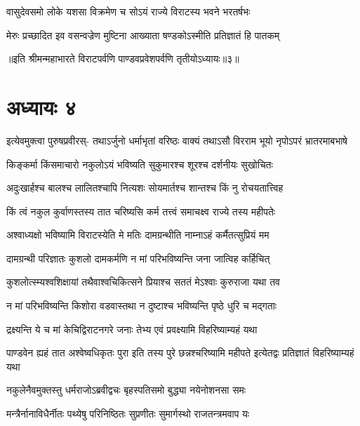 


\twolineshloka
{वासुदेवसमो लोके यशसा विक्रमेण च}
{सोऽयं राज्ये विराटस्य भवने भरतर्षभः}


\twolineshloka
{मेरुः प्रच्छादित इव वसन्वज्रेण मुष्टिना}
{आख्याता षण्डकोऽस्मीति प्रतिज्ञातं हि पातकम्}

॥इति श्रीमन्महाभारते विराटपर्वणि पाण्डवप्रवेशपर्वणि तृतीयोऽध्यायः॥३॥

\chapter{अध्यायः ४}

\fourlineindentedshloka
{इत्येवमुक्त्वा पुरुषप्रवीरस्-}
{तथाऽर्जुनो धर्माभृतां वरिष्ठः}
{वाक्यं तथाऽसौ विरराम भूयो}
{नृपोऽपरं भ्रातरमाबभाषे}


\twolineshloka
{किङ्कर्मा किंसमाचारो नकुलोऽयं भविष्यति}
{सुकुमारश्च शूरश्च दर्शनीयः सुखोचितः}


\twolineshloka
{अदुःखार्हश्च बालश्च लालितश्चापि नित्यशः}
{सोयमार्तश्च शान्तश्च किं नु रोचयतात्त्विह}


\twolineshloka
{किं त्वं नकुल कुर्वाणस्तस्य तात चरिष्यसि}
{कर्म तत्त्वं समाचक्ष्व राज्ये तस्य महीपतेः}




\twolineshloka
{अश्वाध्यक्षो भविष्यामि विराटस्येति मे मतिः}
{दामग्रन्थीति नाम्नाऽहं कर्मैतत्सुप्रियं मम}


\twolineshloka
{दामग्रन्थी परिज्ञातः कुशलो दामकर्मणि}
{न मां परिभविष्यन्ति जना जात्विह कर्हिचित्}


\twolineshloka
{कुशलोत्स्म्यश्वशिक्षायां तथैवाश्वचिकित्सने}
{प्रियाश्च सततं मेऽश्वाः कुरुराजा यथा तव}


\twolineshloka
{न मां परिभविष्यन्ति किशोरा वडवास्तथा}
{न दुष्टाश्च भविष्यन्ति पृष्ठे धुरि च मद्गताः}


\twolineshloka
{द्रक्ष्यन्ति ये च मां केचिद्विराटनगरे जनाः}
{तेभ्य एवं प्रवक्ष्यामि विहरिष्याम्यहं यथा}


\threelineshloka
{पाण्डवेन ह्यहं तात अश्वेष्वधिकृतः पुरा}
{इति तस्य पुरे छन्नश्चरिष्यामि महीपते}
{इत्येतद्वः प्रतिज्ञातं विहरिष्याम्यहं यथा}



\twolineshloka
{नकुलेनैवमुक्तस्तु धर्मराजोऽब्रवीद्वचः}
{बृहस्पतिसमो बुद्ध्या नयेनोशनसा समः}


\twolineshloka
{मन्त्रैर्नानाविधैर्नीतः पथ्येषु परिनिष्ठितः}
{सुप्रणीतः सुमार्गस्थो राजतन्त्रमवाप यः}


